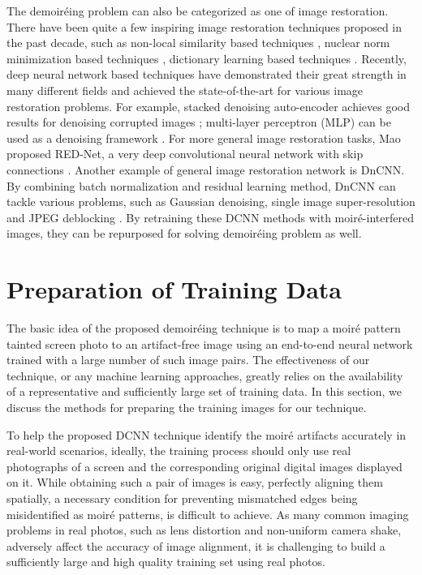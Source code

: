 \documentclass[10pt,twocolumn,letterpaper]{article}
\begin{document}
The demoir\'eing problem can also be categorized as one of image
restoration.  There have been quite a few inspiring image restoration
techniques proposed in the past decade, such as non-local similarity
based techniques \cite{dabov2007image}, nuclear norm minimization
based techniques \cite{gu2014weighted}, dictionary learning based
techniques \cite{elad2006image, chatterjee2009clustering,
  wang2015learning}.  Recently, deep neural network based techniques
have demonstrated their great strength in many different fields and
achieved the state-of-the-art for various image restoration problems.
For example, stacked denoising auto-encoder achieves good results for
denoising corrupted images \cite{vincent2010stacked}; multi-layer
perceptron (MLP) can be used as a denoising framework
\cite{burger2012image}.  For more general image restoration tasks, Mao
proposed RED-Net, a very deep convolutional neural network with skip
connections \cite{mao2016image}.  Another example of general image
restoration network is DnCNN.  By combining batch normalization and
residual learning method, DnCNN can tackle various problems, such as
Gaussian denoising, single image super-resolution and JPEG deblocking
\cite{zhang2017beyond}.  By retraining these DCNN methods with
moir\'e-interfered images, they can be repurposed for solving
demoir\'eing problem as well.

\section{Preparation of Training Data}
\label{sec:data}

The basic idea of the proposed demoir\'eing technique is to map a
moir\'e pattern tainted screen photo to an artifact-free image using
an end-to-end neural network trained with a large number of such image
pairs.  The effectiveness of our technique, or any machine learning
approaches, greatly relies on the availability of a representative and
sufficiently large set of training data.  In this section, we discuss
the methods for preparing the training images for our technique.

To help the proposed DCNN technique identify the moir\'e artifacts
accurately in real-world scenarios, ideally, the training process
should only use real photographs of a screen and the corresponding
original digital images displayed on it.  While obtaining such a pair
of images is easy, perfectly aligning them spatially, a necessary
condition for preventing mismatched edges being misidentified as
moir\'e patterns, is difficult to achieve.  As many common imaging
problems in real photos, such as lens distortion and non-uniform
camera shake, adversely affect the accuracy of image alignment, it is
challenging to build a sufficiently large and high quality training
set using real photos.
\end{document}
